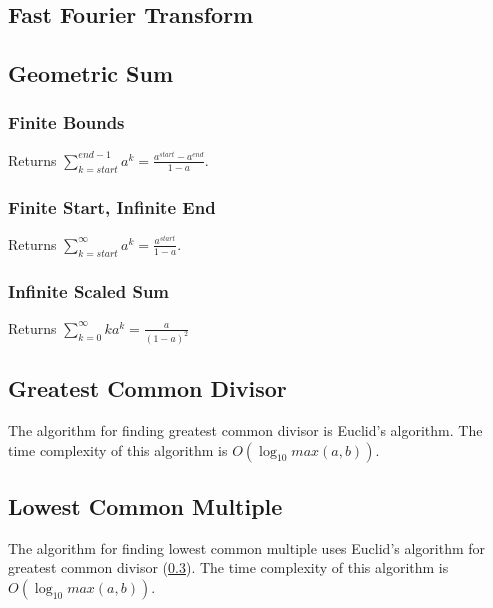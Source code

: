\documentclass[letterpaper,11pt,twoside]{article}
\begin{document}
            \subsection{Fast Fourier Transform}
            \subsection{Geometric Sum}
                \subsubsection{Finite Bounds}
                    Returns $\sum_{k=start}^{end-1}a^{k} = \frac{a^{start} - a^{end}}{1 - a}$.
                    
                    
                \subsubsection{Finite Start, Infinite End}
                    Returns $\sum_{k=start}^{\infty}a^{k} = \frac{a^{start}}{1 - a}$.
                    
                    
                \subsubsection{Infinite Scaled Sum}
                    Returns $\sum_{k=0}^{\infty}ka^{k} = \frac{a}{(1-a)^{2}}$
                    
                    
            \subsection{Greatest Common Divisor} \label{gcd}
                The algorithm for finding greatest common divisor is Euclid's algorithm.
                The time complexity of this algorithm is $O(\log_{10} max(a,b))$.
                
                
            \subsection{Lowest Common Multiple}
                The algorithm for finding lowest common multiple uses Euclid's algorithm for greatest common divisor (\ref{gcd}).
                The time complexity of this algorithm is $O(\log_{10} max(a,b))$.
                
                
\end{document}
